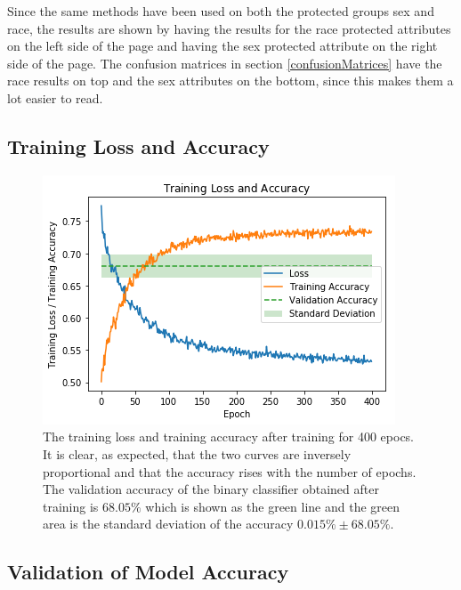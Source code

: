 \documentclass[11pt, fleqn, titlepage]{article}
\begin{document}
	Since the same methods have been used on both the protected groups sex and race, the results are shown by having the results for the race protected attributes on the left side of the page and having the sex protected attribute on the right side of the page. The confusion matrices in section \ref{confusionMatrices} have the race results on top and the sex attributes on the bottom, since this makes them a lot easier to read.
	
	\subsection{Training Loss and Accuracy}\label{training_loss_and_accuracy}
	
	\begin{figure}[H]
			\centering
			\includegraphics[width=0.5\linewidth]{imgs/loss_curve.png}
		\caption{The training loss and training accuracy after training for 400 epocs. It is clear, as expected, that the two curves are inversely proportional and that the accuracy rises with the number of epochs.  The validation accuracy of the binary classifier obtained after training is $ 68.05\%$ which is shown as the green line and the green area is the standard deviation of the accuracy $0.015\% \pm 68.05\%$.%
		}
		\label{fig:losscurve}
	\end{figure}
	
	\subsection{Validation of Model Accuracy}\label{modelAccuracy}
	
\end{document}
